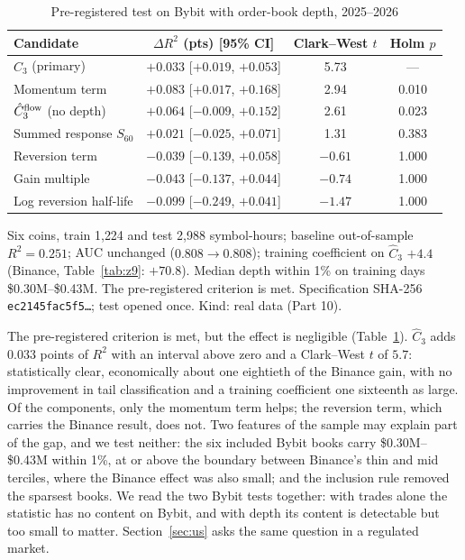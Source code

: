 \documentclass[12pt]{article}
\theoremstyle{definition}
\theoremstyle{remark}
\begin{document}
\begin{table}[t]\centering\small
\begin{threeparttable}
\caption{Pre-registered test on Bybit with order-book depth, 2025--2026}\label{tab:bybitob}
\setlength{\tabcolsep}{3pt}
\begin{tabular}{lccc}
\toprule
Candidate & $\Delta R^2$ (pts) [95\% CI] & Clark--West $t$ & Holm $p$\\
\midrule
$\hat C_3$ (primary) & $+0.033$ [$+0.019$, $+0.053$] & 5.73 & ---\\
Momentum term & $+0.083$ [$+0.017$, $+0.168$] & 2.94 & 0.010\\
$\hat C_3^{\rm flow}$ (no depth) & $+0.064$ [$-0.009$, $+0.152$] & 2.61 & 0.023\\
Summed response $S_{60}$ & $+0.021$ [$-0.025$, $+0.071$] & 1.31 & 0.383\\
Reversion term & $-0.039$ [$-0.139$, $+0.058$] & $-0.61$ & 1.000\\
Gain multiple & $-0.043$ [$-0.137$, $+0.044$] & $-0.74$ & 1.000\\
Log reversion half-life & $-0.099$ [$-0.249$, $+0.041$] & $-1.47$ & 1.000\\
\bottomrule
\end{tabular}
\begin{tablenotes}\footnotesize\item Six coins, train 1{,}224 and test 2{,}988 symbol-hours; baseline out-of-sample $R^2=0.251$; AUC unchanged ($0.808\to0.808$); training coefficient on $\hat C_3$ $+4.4$ (Binance, Table~\ref{tab:z9}: $+70.8$). Median depth within 1\% on training days \$0.30M--\$0.43M. The pre-registered criterion is met. Specification SHA-256 \texttt{ec2145fac5f5\ldots}; test opened once. Kind: real data (Part 10).\end{tablenotes}
\end{threeparttable}
\end{table}

The pre-registered criterion is met, but the effect is negligible (Table~\ref{tab:bybitob}). $\hat C_3$ adds $0.033$ points of $R^2$ with an interval above zero and a Clark--West $t$ of $5.7$: statistically clear, economically about one eightieth of the Binance gain, with no improvement in tail classification and a training coefficient one sixteenth as large. Of the components, only the momentum term helps; the reversion term, which carries the Binance result, does not. Two features of the sample may explain part of the gap, and we test neither: the six included Bybit books carry \$0.30M--\$0.43M within 1\%, at or above the boundary between Binance's thin and mid terciles, where the Binance effect was also small; and the inclusion rule removed the sparsest books. We read the two Bybit tests together: with trades alone the statistic has no content on Bybit, and with depth its content is detectable but too small to matter. Section~\ref{sec:us} asks the same question in a regulated market.
\end{document}

